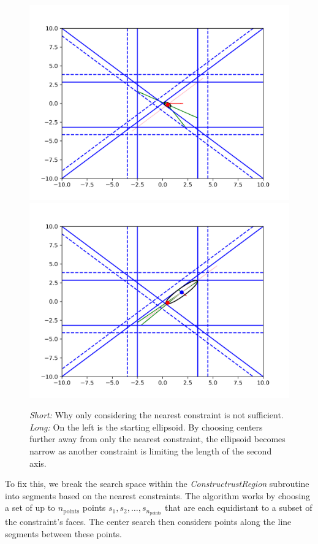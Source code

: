 \begin{figure}[ht]
    \centering
    \includegraphics[scale=0.4]{images/line_1.png}
    \includegraphics[scale=0.4]{images/line_2.png}
    \caption{
    	\emph{Short:} Why only considering the nearest constraint is not sufficient. 
    	\emph{Long:} On the left is the starting ellipsoid.
    	By choosing centers further away from only the nearest constraint, the ellipsoid becomes narrow as another constraint is limiting the length of the second axis.
	}
    \label{first_line_search}
\end{figure}

To fix this, we break the search space within the \emph{ConstructrustRegion} subroutine into segments based on the nearest constraints.
The algorithm works by choosing a set of up to $n_{\text{points}}$ points $s_1, s_2, \ldots, s_{n_{\text{points}}}$ that are each equidistant to a subset of the constraint's faces.
The center search then considers points along the line segments between these points.

